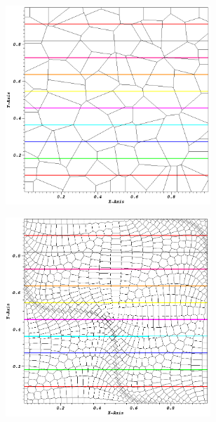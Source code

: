 \begin{figure}
\begin{subfigure}[b]{0.45\textwidth}
		\centering
		\includegraphics[width=0.85\textwidth]{figures/sec_DSA/SIP_poly_lin_contour.png}
		\caption{}
	\end{subfigure}
	\vfill
	\begin{subfigure}[b]{0.45\textwidth}
		\centering
		\includegraphics[width=0.85\textwidth]{figures/sec_DSA/SIP_sine_poly_lin_contour.png}
		\caption{}
	\end{subfigure}
	\hfill
	\begin{subfigure}[b]{0.45\textwidth}
		\centering

\end{subfigure}
\end{figure}
